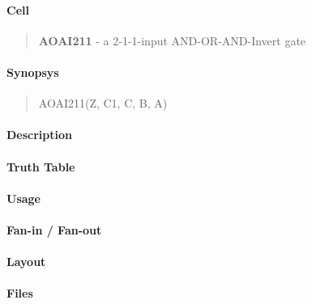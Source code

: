 \label{AOAI211}
\paragraph{Cell}
\begin{quote}
    \textbf{AOAI211} - a 2-1-1-input AND-OR-AND-Invert gate
\end{quote}

\paragraph{Synopsys}
\begin{quote}
    AOAI211(Z, C1, C, B, A)
\end{quote}

\paragraph{Description}

%

\paragraph{Truth Table}
%

\paragraph{Usage}

\paragraph{Fan-in / Fan-out}

\paragraph{Layout}

\paragraph{Files}

